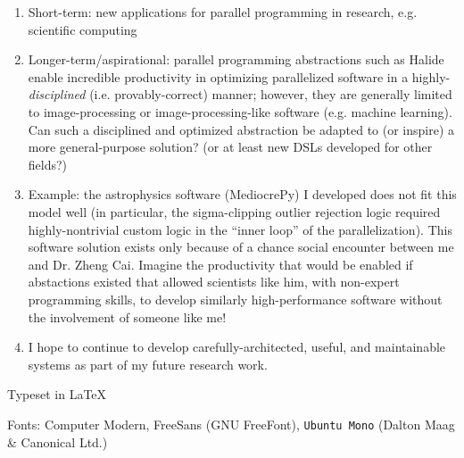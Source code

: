 \documentclass[11pt]{article}
\begin{document}
\begin{enumerate}
\item Short-term: new applications for parallel programming in
  research, e.g. scientific computing
\item Longer-term/aspirational: parallel programming abstractions such
  as Halide enable incredible productivity in optimizing parallelized
  software in a highly-\textit{disciplined} (i.e. provably-correct)
  manner; however, they are generally limited to image-processing or
  image-processing-like software (e.g. machine learning). Can such a
  disciplined and optimized abstraction be adapted to (or inspire) a
  more general-purpose solution? (or at least new DSLs developed for
  other fields?)
\item Example: the astrophysics software (MediocrePy) I developed does
  not fit this model well (in particular, the sigma-clipping outlier
  rejection logic required highly-nontrivial custom logic in the
  ``inner loop'' of the parallelization). This software solution
  exists only because of a chance social encounter between me and
  Dr. Zheng Cai. Imagine the productivity that would be enabled if
  abstactions existed that allowed scientists like him, with
  non-expert programming skills, to develop similarly high-performance
  software without the involvement of someone like me!
\item I hope to continue to develop carefully-architected, useful, and
  maintainable systems as part of my future research work.
\end{enumerate}

{
\vfill
\begin{center}
\color{gray}
Typeset in \LaTeX\

Fonts: Computer Modern, \textsf{FreeSans} (GNU FreeFont),
\texttt{Ubuntu Mono} (Dalton Maag \& Canonical Ltd.)
\end{center}
}
\end{document}
